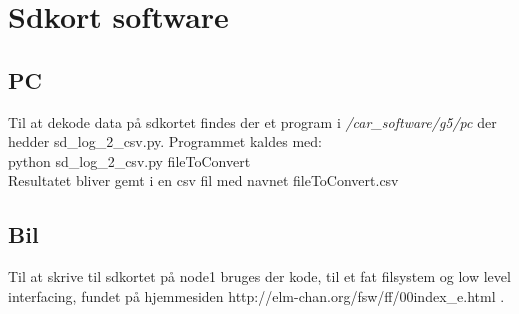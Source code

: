 \section{Sdkort software}

\subsection{PC}
Til at dekode data på sdkortet findes der et program i \textit{/car\_software/g5/pc} der hedder sd\_log\_2\_csv.py. Programmet kaldes med:
\\
python sd\_log\_2\_csv.py fileToConvert
\\
Resultatet bliver gemt i en csv fil med navnet fileToConvert.csv

\subsection{Bil}
Til at skrive til sdkortet på node1 bruges der kode, til et fat filsystem og low level interfacing, fundet på hjemmesiden http://elm-chan.org/fsw/ff/00index\_e.html \citep{chan}.

